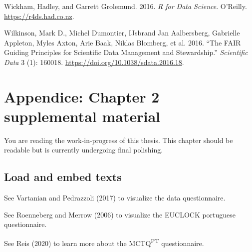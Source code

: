 \documentclass[
  12pt,
  a4paper,
  oneside]{tesesusp}
\newlength{\cslhangindent}
\newlength{\cslentryspacingunit} %
\newenvironment{CSLReferences}[2] %
 {%
  \setlength{\parindent}{0pt}
  \ifodd #1
  \let\oldpar\par
  \def\par{\hangindent=\cslhangindent\oldpar}
  \fi
  \setlength{\parskip}{#2\cslentryspacingunit}
 }%
 {}
\begin{document}
\begin{CSLReferences}{1}{0}
\leavevmode{}%
Wickham, Hadley, and Garrett Grolemund. 2016. \emph{R for Data Science}.
O'Reilly. \url{https://r4ds.had.co.nz}.

\leavevmode{}%
Wilkinson, Mark D., Michel Dumontier, IJsbrand Jan Aalbersberg,
Gabrielle Appleton, Myles Axton, Arie Baak, Niklas Blomberg, et al.
2016. {``The FAIR Guiding Principles for Scientific Data Management and
Stewardship.''} \emph{Scientific Data} 3 (1): 160018.
\url{https://doi.org/10.1038/sdata.2016.18}.

\end{CSLReferences}

\cleardoublepage
{}
{}
\appendix

\hypertarget{appendice-chapter-2-supplemental-material}{%
\chapter{Appendice: Chapter 2 supplemental
material}\label{appendice-chapter-2-supplemental-material}}

\begin{tcolorbox}[enhanced jigsaw, breakable, colback=white, colbacktitle=quarto-callout-note-color!10!white, leftrule=.75mm, left=2mm, toprule=.15mm, opacityback=0, rightrule=.15mm, title=\textcolor{quarto-callout-note-color}{\faInfo}\hspace{0.5em}{Note}, opacitybacktitle=0.6, bottomtitle=1mm, titlerule=0mm, toptitle=1mm, coltitle=black, colframe=quarto-callout-note-color-frame, bottomrule=.15mm, arc=.35mm]

You are reading the work-in-progress of this thesis. This chapter should
be readable but is currently undergoing final polishing.

\end{tcolorbox}

\hypertarget{load-and-embed-texts}{%
\section{Load and embed texts}\label{load-and-embed-texts}}

See Vartanian and Pedrazzoli (2017) to visualize the data questionnaire.

See Roenneberg and Merrow (2006) to visualize the EUCLOCK portuguese
questionnaire.

See Reis (2020) to learn more about the MCTQ\textsuperscript{PT}
questionnaire.
\end{document}
